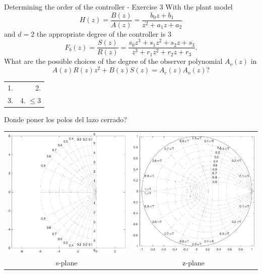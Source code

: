 \documentclass[presentation,aspectratio=169]{beamer}
\begin{document}
\begin{frame}[label={sec:org6e5b3e5}]{Determining the order of the controller - Exercise 3}
With the plant model \[H(z) = \frac{B(z)}{A(z)} = \frac{b_0z + b_1}{z^2 + a_1z + a_2}\] and \(d=2\)    the appropriate degree of the controller is 3
\[F_b(z) = \frac{S(z)}{R(z)} = \frac{s_0z^3 + s_1z^2 + s_2z + s_3}{z^3 + r_1 z^2 + r_2z + r_3}.\]
What are the possible choices of the degree of the observer polynomial \(A_o(z)\) in
\[ A(z)R(z)z^2 + B(z)S(z) = A_c(z)A_o(z)?\]
\begin{center}
\begin{tabular}{rr}
1. & 2.\\
3. & 4. \(\le 3\)\\
\end{tabular}
\end{center}
\end{frame}

\begin{frame}[label={sec:org708b1b5}]{Donde poner los polos del lazo cerrado?}
\begin{center}
\begin{tabular}{cc}
 \includegraphics[width=0.41\linewidth]{../../figures/sgrid-crop}
& \includegraphics[width=0.43\linewidth]{../../figures/zgrid-crop}\\
s-plane & z-plane
\end{tabular}
\end{center}
\end{frame}
\end{document}
